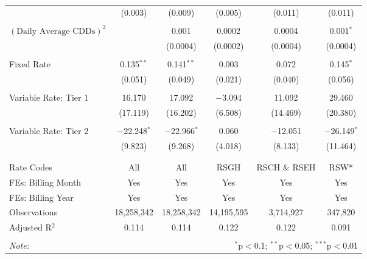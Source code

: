 \begin{table}[!htbp]
\begin{adjustbox}{scale = 0.95}
\begin{tabular}{@{\extracolsep{5pt}}lccccc}
  & (0.003) & (0.009) & (0.005) & (0.011) & (0.011) \\ 
  & & & & & \\ 
 $(\text{Daily Average CDDs})^{2}$ &  & 0.001 & 0.0002 & 0.0004 & 0.001$^{*}$ \\ 
  &  & (0.0004) & (0.0002) & (0.0004) & (0.0004) \\ 
  & & & & & \\ 
 Fixed Rate & 0.135$^{**}$ & 0.141$^{**}$ & 0.003 & 0.072 & 0.145$^{*}$ \\ 
  & (0.051) & (0.049) & (0.021) & (0.040) & (0.056) \\ 
  & & & & & \\ 
 Variable Rate: Tier 1 & 16.170 & 17.092 & $-$3.094 & 11.092 & 29.460 \\ 
  & (17.119) & (16.202) & (6.508) & (14.469) & (20.380) \\ 
  & & & & & \\ 
 Variable Rate: Tier 2 & $-$22.248$^{*}$ & $-$22.966$^{*}$ & 0.060 & $-$12.051 & $-$26.149$^{*}$ \\ 
  & (9.823) & (9.268) & (4.018) & (8.133) & (11.464) \\ 
  & & & & & \\ 
\hline \\[-1.8ex] 
Rate Codes & All & All & RSGH & RSCH \& RSEH & RSW* \\ 
FEs: Billing Month & Yes & Yes & Yes & Yes & Yes \\ 
FEs: Billing Year & Yes & Yes & Yes & Yes & Yes \\ 
Observations & 18,258,342 & 18,258,342 & 14,195,595 & 3,714,927 & 347,820 \\ 
Adjusted R$^{2}$ & 0.114 & 0.114 & 0.122 & 0.122 & 0.091 \\ 
\hline 
\hline \\[-1.8ex] 
\textit{Note:}  & \multicolumn{5}{r}{$^{*}$p$<$0.1; $^{**}$p$<$0.05; $^{***}$p$<$0.01} \\ 
\end{tabular} 
\end{adjustbox}
\end{table} 
